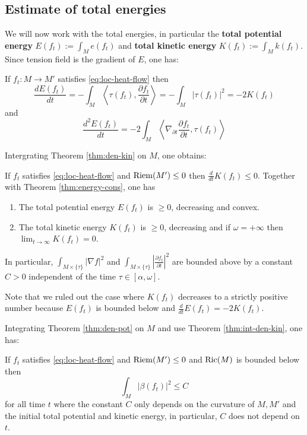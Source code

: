 \subsection{Estimate of total energies}
\label{sec:org18b792d}

We will now work with the total energies, in particular the \textbf{total potential energy} \(E(f_t) := \int_M e(f_t)\) and \textbf{total kinetic energy} \(K(f_t) := \int_M k(f_t)\). Since
tension field is the gradient of \(E\), one has:

\begin{theorem}
\label{thm:energy-cons}
If \(f_t: M \longrightarrow  M'\) satisfies \eqref{eq:loc-heat-flow} then
\[
 \frac{d E(f_t)}{dt} = -\int_M \left\langle \tau(f_t), \frac{\partial f_t}{\partial t}
\right \rangle = -\int_M |\tau(f_t)|^2 = -2K(f_t)
\]
and
\[
\frac{d^2 E(f_t)}{dt} = -2\int_M \left \langle \nabla_{\partial t}\frac{\partial
f_t}{\partial t},\tau(f_t)\right \rangle
\]
\end{theorem}

Intergrating Theorem \ref{thm:den-kin} on \(M\), one obtains:

\begin{theorem}
\label{thm:int-den-kin}
If \(f_t\) satisfies \eqref{eq:loc-heat-flow} and \(\mathop{\rm Riem}\nolimits(M')\leq 0\) then \(\frac{d
}{dt}K(f_t) \leq 0\). Together with Theorem \ref{thm:energy-cons}, one has
\begin{enumerate}
\item The total potential energy \(E(f_t)\) is \(\geq 0\), decreasing and convex.
\item The total kinetic energy \(K(f_t)\) is \(\geq 0\), decreasing and if \(\omega =
   +\infty\) then \(\lim_{t\to\infty} K(f_t) = 0\).
\end{enumerate}
In particular, \(\int_{M\times \{\tau\}} |\nabla f|^2\) and \(\int_{M\times\{\tau\}} \left|
\frac{\partial f_t}{\partial t} \right|^2\) are bounded above by a constant \(C>0\)
independent of the time \(\tau \in[\alpha,\omega]\).
\end{theorem}
Note that we ruled out the case where \(K(f_t)\) decreases to a strictly positive number
because \(E(f_t)\) is bounded below and \(\frac{d }{d t} E(f_t) = -2K(f_t)\).


Integrating Theorem \ref{thm:den-pot} on \(M\) and use Theorem \ref{thm:int-den-kin}, one has:

\begin{theorem}
\label{thm:int-den-pot}
If \(f_t\) satisfies \eqref{eq:loc-heat-flow} and \(\mathop{\rm Riem}\nolimits(M')\leq 0\) and \(\mathop{\rm Ric}\nolimits(M)\)
is bounded below then 
\[
\int_M |\beta(f_t)|^2 \leq C
\]
for all time \(t\) where the constant \(C\) only depends on the curvature of \(M, M'\) and the initial total potential and kinetic energy, in particular, \(C\) does not depend on \(t\).
\end{theorem}

